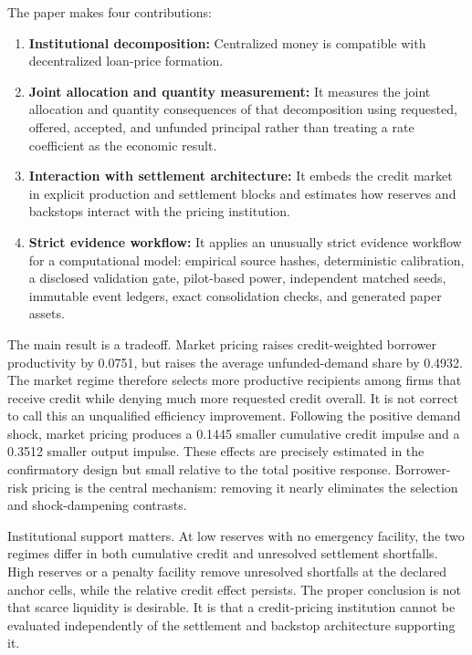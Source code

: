\documentclass[11pt,a4paper]{article}
\begin{document}
The paper makes four contributions:
\begin{enumerate}
    \item \textbf{Institutional decomposition:} Centralized money is compatible with decentralized loan-price formation.
    \item \textbf{Joint allocation and quantity measurement:} It measures the joint allocation and quantity consequences of that decomposition using requested, offered, accepted, and unfunded principal rather than treating a rate coefficient as the economic result.
    \item \textbf{Interaction with settlement architecture:} It embeds the credit market in explicit production and settlement blocks and estimates how reserves and backstops interact with the pricing institution.
    \item \textbf{Strict evidence workflow:} It applies an unusually strict evidence workflow for a computational model: empirical source hashes, deterministic calibration, a disclosed validation gate, pilot-based power, independent matched seeds, immutable event ledgers, exact consolidation checks, and generated paper assets.
\end{enumerate}

The main result is a tradeoff. Market pricing raises credit-weighted borrower productivity by 0.0751, but raises the average unfunded-demand share by 0.4932. The market regime therefore selects more productive recipients among firms that receive credit while denying much more requested credit overall. It is not correct to call this an unqualified efficiency improvement. Following the positive demand shock, market pricing produces a 0.1445 smaller cumulative credit impulse and a 0.3512 smaller output impulse. These effects are precisely estimated in the confirmatory design but small relative to the total positive response. Borrower-risk pricing is the central mechanism: removing it nearly eliminates the selection and shock-dampening contrasts.

Institutional support matters. At low reserves with no emergency facility, the two regimes differ in both cumulative credit and unresolved settlement shortfalls. High reserves or a penalty facility remove unresolved shortfalls at the declared anchor cells, while the relative credit effect persists. The proper conclusion is not that scarce liquidity is desirable. It is that a credit-pricing institution cannot be evaluated independently of the settlement and backstop architecture supporting it.
\end{document}
